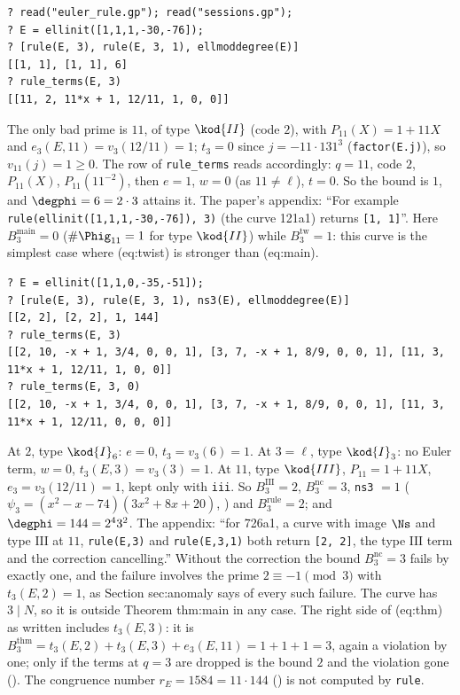 \begin{sloppypar}
\begin{example}[\curve{121a1}]\label{ex:computation:121a1}
\begin{lstlisting}[language=GP]
? read("euler_rule.gp"); read("sessions.gp");
? E = ellinit([1,1,1,-30,-76]);
? [rule(E, 3), rule(E, 3, 1), ellmoddegree(E)]
[[1, 1], [1, 1], 6]
? rule_terms(E, 3)
[[11, 2, 11*x + 1, 12/11, 1, 0, 0]]
\end{lstlisting}
The only bad prime is $11$, of type $\kod{II}$ (code $2$), with $P_{11}(X)=1+11X$ and $e_3(E,11)=v_3(12/11)=1$; $t_3=0$ since $j=-11\cdot131^3$ (\texttt{factor(E.j)}),
so $v_{11}(j)=1\ge0$. The row of \texttt{rule\_terms} reads accordingly: $q=11$, code $2$, $P_{11}(X)$, $P_{11}(11^{-2})$, then $e=1$, $w=0$ (as $11\ne\ell$),
$t=0$. So the bound is
$1$, and $\degphi=6=2\cdot3$ attains it. The paper's appendix: ``For example \texttt{rule(ellinit([1,1,1,-30,-76]), 3)} (the curve 121a1)
returns \texttt{[1, 1]}''. Here $B^{\mathrm{main}}_3=0$ ($\#\Phig_{11}=1$ for type $\kod{II}$) while $B^{\mathrm{tw}}_3=1$: this curve is the simplest case where (eq:twist)
is stronger than (eq:main).
\end{example}

\begin{example}\label{ex:computation:726a1}
\begin{lstlisting}[language=GP]
? E = ellinit([1,1,0,-35,-51]);
? [rule(E, 3), rule(E, 3, 1), ns3(E), ellmoddegree(E)]
[[2, 2], [2, 2], 1, 144]
? rule_terms(E, 3)
[[2, 10, -x + 1, 3/4, 0, 0, 1], [3, 7, -x + 1, 8/9, 0, 0, 1], [11, 3, 11*x + 1, 12/11, 1, 0, 0]]
? rule_terms(E, 3, 0)
[[2, 10, -x + 1, 3/4, 0, 0, 1], [3, 7, -x + 1, 8/9, 0, 0, 1], [11, 3, 11*x + 1, 12/11, 0, 0, 0]]
\end{lstlisting}
At $2$, type $\kod{I}_6$: $e=0$, $t_3=v_3(6)=1$. At $3=\ell$, type $\kod{I}_3$: no Euler term, $w=0$, $t_3(E,3)=v_3(3)=1$. At $11$, type $\kod{III}$, $P_{11}=1+11X$,
$e_3=v_3(12/11)=1$, kept only with \texttt{iii}. So $B^{\mathrm{III}}_3=2$, $B^{\mathrm{nc}}_3=3$, \texttt{ns3} $=1$ ($\psi_3=(x^2-x-74)(3x^2+8x+20)$,
) and $B^{\mathrm{rule}}_3=2$; and $\degphi=144=2^43^2$. The appendix: ``for 726a1, a curve with image $\Ns$ and type
$\mathrm{III}$ at $11$, \texttt{rule(E,3)} and \texttt{rule(E,3,1)} both return \texttt{[2, 2]}, the type $\mathrm{III}$ term and the correction
cancelling.'' Without the correction the bound $B^{\mathrm{nc}}_3=3$ fails by exactly one, and the failure involves the prime $2\equiv-1\pmod3$ with
$t_3(E,2)=1$, as Section sec:anomaly says of every such failure. The curve has $3\mid N$, so it is outside Theorem thm:main in any case. The right side of (eq:thm) as written includes $t_3(E,3)$: it is
$B^{\mathrm{thm}}_3=t_3(E,2)+t_3(E,3)+e_3(E,11)=1+1+1=3$, again a violation by one; only if the terms at $q=3$ are dropped is the bound $2$ and the
violation gone (). The congruence number $r_E=1584=11\cdot144$ () is not computed by \texttt{rule}.
\end{example}


\end{sloppypar}
